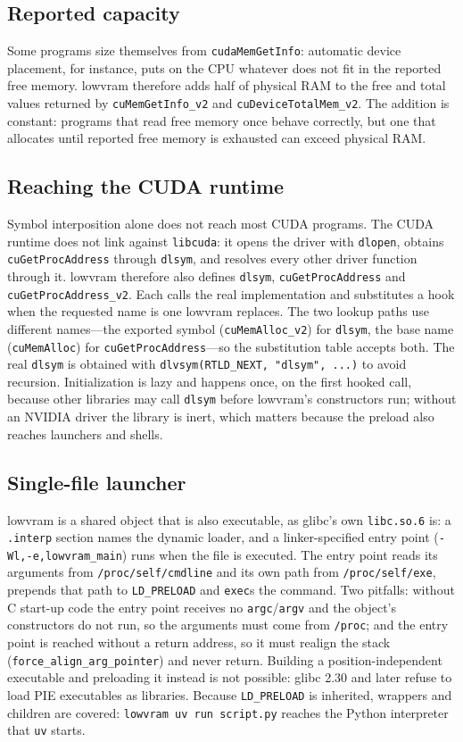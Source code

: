 \documentclass[11pt]{article}
\begin{document}
\subsection{Reported capacity}
Some programs size themselves from \texttt{cudaMemGetInfo}: automatic device placement, for
instance, puts on the CPU whatever does not fit in the reported free memory. lowvram therefore adds
half of physical RAM to the free and total values returned by \texttt{cuMemGetInfo\_v2} and
\texttt{cuDeviceTotalMem\_v2}. The addition is constant: programs that read free memory once
behave correctly, but one that allocates until reported free memory is exhausted can exceed
physical RAM.

\subsection{Reaching the CUDA runtime}
Symbol interposition alone does not reach most CUDA programs. The CUDA runtime does not link
against \texttt{libcuda}: it opens the driver with \texttt{dlopen}, obtains
\texttt{cuGetProcAddress} through \texttt{dlsym}, and resolves every other driver function through
it. lowvram therefore also defines \texttt{dlsym}, \texttt{cuGetProcAddress} and
\texttt{cuGetProcAddress\_v2}. Each calls the real implementation and substitutes a hook when the
requested name is one lowvram replaces. The two lookup paths use different names---the exported
symbol (\texttt{cuMemAlloc\_v2}) for \texttt{dlsym}, the base name (\texttt{cuMemAlloc}) for
\texttt{cuGetProcAddress}---so the substitution table accepts both. The real \texttt{dlsym} is
obtained with \texttt{dlvsym(RTLD\_NEXT, "dlsym", ...)} to avoid recursion. Initialization is lazy
and happens once, on the first hooked call, because other libraries may call \texttt{dlsym} before
lowvram's constructors run; without an NVIDIA driver the library is inert, which matters because
the preload also reaches launchers and shells.

\subsection{Single-file launcher}
lowvram is a shared object that is also executable, as glibc's own \texttt{libc.so.6} is: a
\texttt{.interp} section names the dynamic loader, and a linker-specified entry point
(\texttt{-Wl,-e,lowvram\_main}) runs when the file is executed. The entry point reads its arguments
from \texttt{/proc/self/cmdline} and its own path from \texttt{/proc/self/exe}, prepends that path
to \texttt{LD\_PRELOAD} and \texttt{exec}s the command. Two pitfalls: without C start-up code the
entry point receives no \texttt{argc}/\texttt{argv} and the object's constructors do not run, so
the arguments must come from \texttt{/proc}; and the entry point is reached without a return
address, so it must realign the stack (\texttt{force\_align\_arg\_pointer}) and never return.
Building a position-independent executable and preloading it instead is not possible: glibc 2.30
and later refuse to load PIE executables as libraries. Because \texttt{LD\_PRELOAD} is inherited,
wrappers and children are covered: \texttt{lowvram uv run script.py} reaches the Python interpreter
that \texttt{uv} starts.
\end{document}

